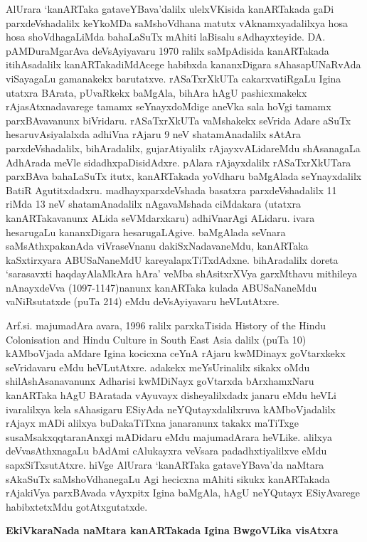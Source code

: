 \documentclass[11pt,a4size]{article}
\begin{document}
AlUrara `kanARTaka gataveYBava'dalilx ulelxVKisida kanARTakada gaDi
parxdeVshadalilx keYkoMDa saMshoVdhana matutx vAknamxyadalilxya hosa
hosa shoVdhagaLiMda bahaLaSuTx mAhiti laBisalu
sAdhayxteyide. DA. pAMDuraMgarAva deVsAyiyavaru 1970 ralilx
saMpAdisida kanARTakada itihAsadalilx kanARTakadiMdAcege habibxda
kananxDigara sAhasapUNaRvAda viSayagaLu gamanakekx
barutatxve. rASaTxrXkUTa cakarxvatiRgaLu Igina utatxra BArata,
pUvaRkekx baMgAla, bihAra hAgU pashicxmakekx rAjasAtxnadavarege tamamx
seYnayxdoMdige aneVka sala hoVgi tamamx parxBAvavanunx
biVridaru. rASaTxrXkUTa vaMshakekx seVrida Adare aSuTx
hesaruvAsiyalalxda adhiVna rAjaru 9 neV shatamAnadalilx sAtAra
parxdeVshadalilx, bihAradalilx, gujarAtiyalilx rAjayxvALidareMdu
shAsanagaLa AdhArada meVle sidadhxpaDisidAdxre. pAlara rAjayxdalilx
rASaTxrXkUTara parxBAva bahaLaSuTx itutx, kanARTakada yoVdharu
baMgAlada seYnayxdalilx BatiR Agutitxdadxru. madhayxparxdeVshada
basatxra parxdeVshadalilx 11 riMda 13 neV shatamAnadalilx nAgavaMshada
ciMdakara (utatxra kanARTakavanunx ALida seVMdarxkaru) adhiVnarAgi
ALidaru. ivara hesarugaLu kananxDigara hesarugaLAgive. baMgAlada
seVnara saMsAthxpakanAda viVraseVnanu dakiSxNadavaneMdu, kanARTaka
kaSxtirxyara ABUSaNaneMdU kareyalapxTiTxdAdxne. bihAradalilx doreta
`sarasavxti haqdayAlaMkAra hAra' veMba shAsitxrXVya garxMthavu
mithileya nAnayxdeVva (1097-1147)nanunx kanARTaka kulada ABUSaNaneMdu
vaNiRsutatxde (puTa 214) eMdu deVsAyiyavaru heVLutAtxre.

Arf.si. majumadAra avara, 1996 ralilx parxkaTisida
{\footnotesize{\rm{History of the Hindu Colonisation and Hindu Culture
      in South East Asia}}} dalilx (puTa 10) kAMboVjada aMdare Igina
kocicxna ceYnA rAjaru kwMDinayx goVtarxkekx seVridavaru eMdu
heVLutAtxre. adakekx meYsUrinalilx sikakx oMdu shilAshAsanavanunx
Adharisi kwMDiNayx goVtarxda bArxhamxNaru kanARTaka hAgU BAratada
vAyuvayx disheyalilxdadx janaru eMdu heVLi ivaralilxya kela sAhasigaru
ESi\-yAda neYQutayxdalilxruva kAMboVjadalilx rAjayx mADi alilxya
buDakaTiTxna janaranunx takakx maTiTxge susaMsakxqqtaranAnxgi mADidaru
eMdu majumadArara heVLike. alilxya deVvasAthxnagaLu bAdAmi cAlukayxra
veVsara padadhxtiyalilxve eMdu sapxSiTxsutAtxre. hiVge AlUrara
`kanARTaka gataveYBava'da naMtara sAkaSuTx saMshoVdhanegaLu Agi
hecicxna mAhiti sikukx kanARTakada rAjakiVya parxBAvada vAyxpitx Igina
baMgAla, hAgU neYQutayx ESiyAvarege habibxtetxMdu gotAtxgutatxde.

\bigskip
\centerline{\textbf{\Large{EkiVkaraNada naMtara kanARTakada Igina
      BwgoVLika visAtxra}}}
\medskip
\end{document}
